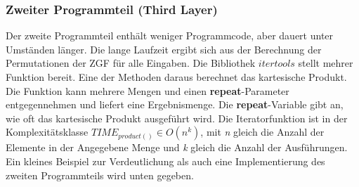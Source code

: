 
    \hypertarget{zweiter-programmteil-third-layer}{%
\subsubsection{Zweiter Programmteil (Third
Layer)}\label{zweiter-programmteil-third-layer}}

Der zweite Programmteil enthält weniger Programmcode, aber dauert unter
Umständen länger. Die lange Laufzeit ergibt sich aus der Berechnung der
Permutationen der ZGF für alle Eingaben. Die Bibliothek
\(\textit{itertools}\) stellt mehrer Funktion bereit. Eine der Methoden
daraus berechnet das kartesische Produkt. Die Funktion kann mehrere
Mengen und einen \textbf{repeat}-Parameter entgegennehmen und liefert
eine Ergebnismenge. Die \textbf{repeat}-Variable gibt an, wie oft das
kartesische Produkt ausgeführt wird. Die Iteratorfunktion ist in der
Komplexitätsklasse \(TIME_{product()} \in O(n^k)\), mit \emph{n} gleich
die Anzahl der Elemente in der Angegebene Menge und \emph{k} gleich die
Anzahl der Ausführungen. Ein kleines Beispiel zur Verdeutlichung als
auch eine Implementierung des zweiten Programmteils wird unten gegeben.

